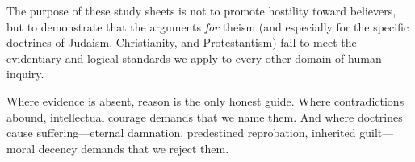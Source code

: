 \documentclass[11pt,twoside]{article}
\begin{document}
The purpose of these study sheets is not to promote hostility toward
believers, but to demonstrate that the arguments \emph{for} theism (and
especially for the specific doctrines of Judaism, Christianity, and
Protestantism) fail to meet the evidentiary and logical standards we
apply to every other domain of human inquiry.

Where evidence is absent, reason is the only honest guide.  Where
contradictions abound, intellectual courage demands that we name them.  And
where doctrines cause suffering---eternal damnation, predestined reprobation,
inherited guilt---moral decency demands that we reject them.

\newpage
\printindex
\end{document}
